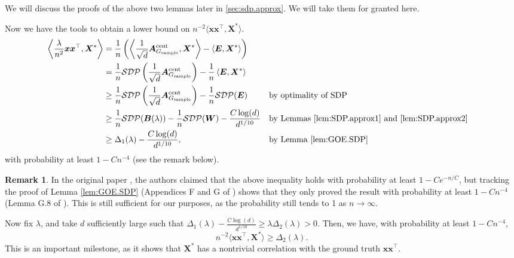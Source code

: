 \documentclass[11pt, titlepage]{article} %
\numberwithin{equation}{section}
\theoremstyle{definition}
\newtheorem{remark}{Remark}
\numberwithin{theorem}{section}
\numberwithin{lemma}{section}
\numberwithin{corollary}{section}
\numberwithin{proposition}{section}
\numberwithin{definition}{section}
\numberwithin{remark}{section}
\begin{document}
We will discuss the proofs of the above two lemmas later in \cref{sec:sdp.approx}. We will take them for granted here.

Now we have the tools to obtain a lower bound on $n^{-2} \langle \bm{x}\bm{x}^\top, \bm{X}^* \rangle$.
\begin{align*}
\left\langle \frac{\lambda}{n^2} \bm{x}\bm{x}^\top, \bm{X}^* \right\rangle & 
= \frac{1}{n}\left(\left\langle \frac{1}{\sqrt{d}}\bm{A}_{G_\mathrm{sample}}^{\mathrm{cent}}, \bm{X}^* \right\rangle - \left\langle \bm{E}, \bm{X}^* \right\rangle\right)\\
& = \frac{1}{n}\mathcal{SDP}\left(\frac{1}{\sqrt{d}}\bm{A}_{G_\mathrm{sample}}^{\mathrm{cent}}\right) - \frac{1}{n}\left\langle \bm{E}, \bm{X}^* \right\rangle\\
& \geq \frac{1}{n}\mathcal{SDP}\left(\frac{1}{\sqrt{d}}\bm{A}_{G_\mathrm{sample}}^{\mathrm{cent}}\right) - \frac{1}{n}\mathcal{SDP}(\bm{E})
&& \text{by optimality of SDP}\\
& \geq \frac{1}{n}\mathcal{SDP}(\bm{B}(\lambda)) - \frac{1}{n}\mathcal{SDP}(\bm{W}) - \frac{C\log(d)}{d^{1/10}}
&& \text{by Lemmas \ref{lem:SDP.approx1} and \ref{lem:SDP.approx2}}\\
& \geq \Delta_1(\lambda) - \frac{C\log(d)}{d^{1/10}},
&& \text{by Lemma \ref{lem:GOE.SDP}}
\end{align*}
with probability at least $1 - Cn^{-4}$ (see the remark below).
\begin{remark}
In the original paper \cite{MS16}, the authors claimed that the above inequality holds with probability at least $1 - Ce^{-n/C}$, 
but tracking the proof of Lemma \ref{lem:GOE.SDP} (Appendices F and G of \cite{MS16}) shows that 
they only proved the result with probability at least $1 - Cn^{-4}$ (Lemma G.8 of \cite{MS16}).
This is still sufficient for our purposes, as the probability still tends to 1 as $n \to \infty$.
\end{remark}
Now fix $\lambda$, and take $d$ sufficiently large such that $\Delta_1(\lambda) - \frac{C\log(d)}{d^{1/10}} \geq \lambda \Delta_2(\lambda) > 0$.
Then, we have, with probability at least $1 - Cn^{-4}$,
\[n^{-2}\langle \bm{x}\bm{x}^\top, \bm{X}^* \rangle \geq \Delta_2(\lambda).\]
This is an important milestone, as it shows that $\bm{X}^*$ has a nontrivial correlation with the ground truth $\bm{x}\bm{x}^\top$.
\end{document}
